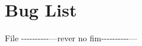 \chapter{Bug List}
\hypertarget{bug}{}\label{bug}

\begin{DoxyRefList}
\item[File \doxylink{apptest_8c}{apptest.c} ]\label{bug__bug000001}%
%
-\/-\/-\/-\/-\/-\/-\/-\/-\/-\/---rever no fim-\/-\/-\/-\/-\/-\/-\/-\/-\/-\/--- 
\end{DoxyRefList}